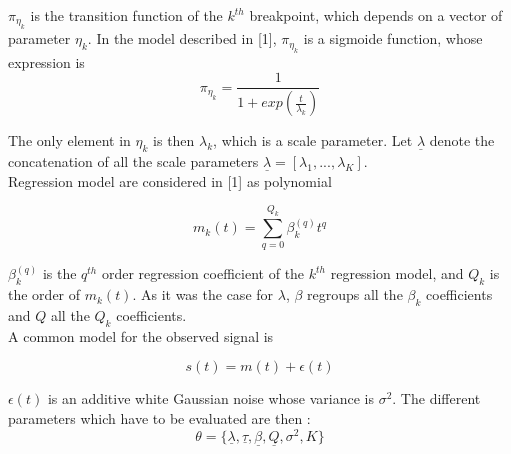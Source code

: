 $\pi_{\eta_{k}}$ is the transition function of the $k^{th}$ breakpoint, which depends on a vector of parameter $\eta_{k}$. In the model described in [1], $\pi_{\eta_{k}}$ is a sigmoide function, whose expression is 
\begin{equation}
\pi_{\eta_{k}} = \frac{1}{1+exp(\frac{t}{\lambda_k})}
\end{equation}

The only element in $\eta_{k}$ is then $\lambda_k$, which is a scale parameter. Let $\underline{\lambda}$ denote the concatenation of all the scale parameters $\underline{\lambda} = [\lambda_1,...,\lambda_K]$.
\\

 Regression model are considered in [1] as polynomial 

\begin{equation}
m_k(t)= \sum_{q=0}^{Q_k} \beta^{(q)} _kt^q
\end{equation}

$\beta^{(q)} _k$ is the $q^{th}$ order regression coefficient of the $k^{th}$ regression model, and $Q_k$ is the order of $m_k(t)$. As it was the case for $\lambda$, $\beta$ regroups all the $\beta_k$ coefficients and $Q$ all the $Q_k$ coefficients.
\\

A common model for the observed signal is 


\begin{equation}
s(t)=m(t) + \epsilon (t)
\end{equation}

$\epsilon (t)$ is an additive white Gaussian noise whose variance is $\sigma^2$. The different parameters which have to be evaluated are then :
\begin{equation}
\theta=\{\underline{\lambda},\underline{\tau},\underline{\beta},\underline{Q},\sigma ^2,K\}
\end{equation}
\\

